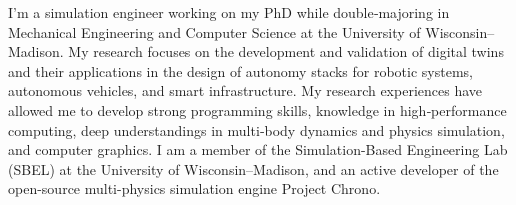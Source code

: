 

\begin{cvparagraph}

I'm a simulation engineer working on my PhD while double‑majoring in Mechanical Engineering and Computer Science at the University of Wisconsin--Madison. My research focuses on the development and validation of digital twins and their applications in the design of autonomy stacks for robotic systems, autonomous vehicles, and smart infrastructure. My research experiences have allowed me to develop strong programming skills, knowledge in high‑performance computing, deep understandings in multi‑body dynamics and physics simulation, and computer graphics. I am a member of the Simulation-Based Engineering Lab (SBEL) at the University of Wisconsin--Madison, and an active developer of the open-source multi-physics simulation engine Project Chrono.\\


\end{cvparagraph}